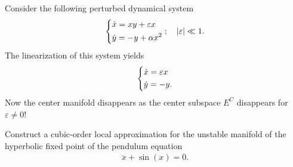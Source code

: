 \begin{ex}
	Consider the following perturbed dynamical system
	\begin{align}
		\begin{dcases}
			\dot{x} = xy + \varepsilon x \\
			\dot{y} = -y + \alpha x^2
		\end{dcases}
;\quad |\varepsilon | \ll 1.
	\end{align}
The linearization of this system yields
\begin{align}
	\begin{dcases}
		\dot{x} = \varepsilon x \\
		\dot{y} = -y.
	\end{dcases}
\end{align}
Now the center manifold disappears as the center subspace $E^{C}$ disappears for $\varepsilon\neq 0$!
\end{ex}

\begin{exercise}
Construct a cubic-order local approximation for the unstable manifold of the hyperbolic fixed point of the pendulum equation
\begin{align}
	\ddot{x} + \sin(x) = 0.
\end{align}
	
\end{exercise}


